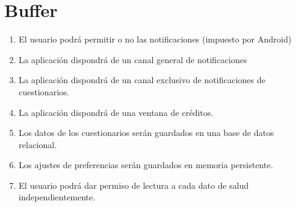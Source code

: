 \section{Buffer}
\begin{enumerate}
    \item El usuario podrá permitir o no las notificaciones (impuesto por Android)
    \item La aplicación dispondrá de un canal general de notificaciones
    \item La aplicación dispondrá de un canal exclusivo de notificaciones de cuestionarios.

    \item La aplicación dispondrá de una ventana de créditos.
    
    \item Los datos de los cuestionarios serán guardados en una base de datos relacional.
    \item Los ajustes de preferencias serán guardados en memoria persistente.
	
    \item El usuario podrá dar permiso de lectura a cada dato de salud independientemente.
\end{enumerate}
